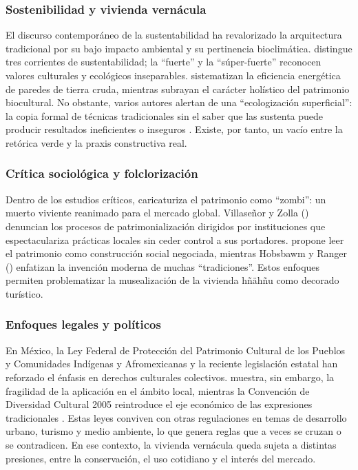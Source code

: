 \subsubsection{Sostenibilidad y vivienda vernácula}

El discurso contemporáneo de la sustentabilidad ha revalorizado la arquitectura tradicional por su bajo impacto ambiental y su pertinencia bioclimática. \cite{gudynas2010desarrollo} distingue tres corrientes de sustentabilidad; la ``fuerte'' y la ``súper-fuerte'' reconocen valores culturales y ecológicos inseparables. \cite{larraga2014sust} sistematizan la eficiencia energética de paredes de tierra cruda, mientras \cite{chang2010patrimonio} subrayan el carácter holístico del patrimonio biocultural.  No obstante, varios autores alertan de una ``ecologización superficial'': la copia formal de técnicas tradicionales sin el saber que las sustenta puede producir resultados ineficientes o inseguros \cite{gandara2000, sanchez2016adobeBTC}.  Existe, por tanto, un vacío entre la retórica verde y la praxis constructiva real.

\subsubsection{Crítica sociológica y folclorización}

Dentro de los estudios críticos, \cite{i2008zombi} caricaturiza el patrimonio como ``zombi'': un muerto viviente reanimado para el mercado global.  Villaseñor y Zolla (\citeyear{villasenor2012patrimonio}) denuncian los procesos de patrimonialización dirigidos por instituciones que espectaculariza prácticas locales sin ceder control a sus portadores. \cite{malavassi2017patrimonio} propone leer el patrimonio como construcción social negociada, mientras Hobsbawm y Ranger (\citeyear{hobsbawm1983inventar}) enfatizan la invención moderna de muchas ``tradiciones''.  Estos enfoques permiten problematizar la musealización de la vivienda hñähñu como decorado turístico.

\subsubsection{Enfoques legales y políticos}

En México, la Ley Federal de Protección del Patrimonio Cultural de los Pueblos y Comunidades Indígenas y Afromexicanas \cite{ley2023patrimonio} y la reciente legislación estatal han reforzado el énfasis en derechos culturales colectivos. \cite{sanchez2013legislacion} muestra, sin embargo, la fragilidad de la aplicación en el ámbito local, mientras la Convención de Diversidad Cultural 2005 reintroduce el eje económico de las expresiones tradicionales \cite{UNESCO2005diversidad}. Estas leyes conviven con otras regulaciones en temas de desarrollo urbano, turismo y medio ambiente, lo que genera reglas que a veces se cruzan o se contradicen. En ese contexto, la vivienda vernácula queda sujeta a distintas presiones, entre la conservación, el uso cotidiano y el interés del mercado.

